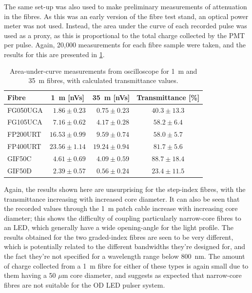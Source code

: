 \documentclass[a4paper,11pt]{article}
\begin{document}
The same set-up was also used to make preliminary measurements of attenuation in the fibres. As this was an early version of the fibre test stand, an optical power meter was not used. Instead, the area under the curve of each recorded pulse was used as a proxy, as this is proportional to the total charge collected by the PMT per pulse. Again, 20,000 measurements for each fibre sample were taken, and the results for this are presented in \cref{tab:attinit}.
\begin{table}[h]
\centering
\begin{tabular}{lccc}
\toprule
Fibre	   & 1~m [nVs]  & 35~m [nVs] &  Transmittance [\%]	\\ \midrule
FG050UGA   &  $\phantom{0}1.86\pm0.23$     &   $\phantom{0}0.75\pm0.23$     & \phantom{0}$40.3\pm13.3$     \\
FG105UCA   &  $\phantom{0}7.16\pm0.62$	    &   $\phantom{0}4.17\pm0.28$    & $58.2\pm6.4$     \\
FP200URT   &  $16.53\pm0.99$				&  	$\phantom{0}9.59\pm0.74$  	& $58.0\pm5.7$     \\
FP400URT   &  $23.56\pm1.14$    			&   $19.24\pm0.94$	 			& $81.7\pm5.6$     \\
GIF50C     &  $\phantom{0}4.61\pm0.69$     &   $\phantom{0}4.09\pm0.59$	 	& \phantom{0}$88.7\pm18.4$     \\
GIF50D     &  $\phantom{0}2.39\pm0.57$     &   $\phantom{0}0.56\pm0.24$     & \phantom{0}$23.4\pm11.5$    \\ \bottomrule
\end{tabular}
\caption{Area-under-curve measurements from oscilloscope for 1~m and 35~m fibres, with calculated transmittance values.}\label{tab:attinit}
\end{table}
Again, the results shown here are unsurprising for the step-index fibres, with the transmittance increasing with increased core diameter. It can also be seen that the recorded values through the 1~m patch cable increase with increasing core diameter; this shows the difficulty of coupling particularly narrow-core fibres to an LED, which generally have a wide opening-angle for the light profile. The results obtained for the two graded-index fibres are seen to be very different, which is potentially related to the different bandwidths they're designed for, and the fact they're not specified for a wavelength range below 800~nm. The amount of charge collected from a 1~m fibre for either of these types is again small due to them having a 50 $\mu$m core diameter, and suggests as expected that narrow-core fibres are not suitable for the OD LED pulser system.
\end{document}
